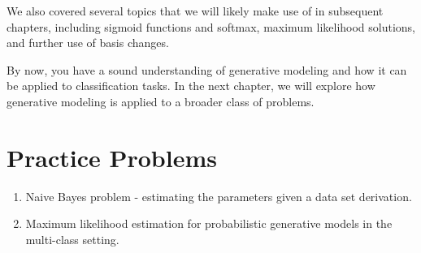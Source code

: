 We also covered several topics that we will likely make use of in subsequent chapters, including sigmoid functions and softmax, maximum likelihood solutions, and further use of basis changes.

By now, you have a sound understanding of generative modeling and how it can be applied to classification tasks. In the next chapter, we will explore how generative modeling is applied to a broader class of problems.

\section{Practice Problems}
\begin{enumerate}
    \item Naive Bayes problem - estimating the parameters given a data set derivation.
    \item Maximum likelihood estimation for probabilistic generative models in the multi-class setting.
\end{enumerate}